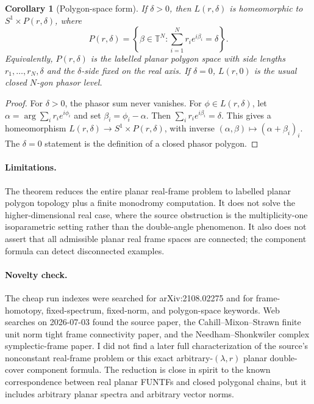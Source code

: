 \documentclass[11pt]{article}
\newtheorem{corollary}{Corollary}
\newcommand{\T}{\mathbb T}
\begin{document}
\begin{corollary}[Polygon-space form]
If \(\delta>0\), then \(L(r,\delta)\) is homeomorphic to \(S^1\times P(r,\delta)\), where
\[
P(r,\delta)=
\left\{\beta\in\T^N:\sum_{i=1}^N r_i e^{i\beta_i}=\delta\right\}.
\]
Equivalently, \(P(r,\delta)\) is the labelled planar polygon space with side lengths \(r_1,\dots,r_N,\delta\) and the \(\delta\)-side fixed on the real axis. If \(\delta=0\), \(L(r,0)\) is the usual closed \(N\)-gon phasor level.
\end{corollary}

\begin{proof}
For \(\delta>0\), the phasor sum never vanishes. For \(\phi\in L(r,\delta)\), let \(\alpha=\arg\sum_i r_i e^{i\phi_i}\) and set \(\beta_i=\phi_i-\alpha\). Then \(\sum_i r_i e^{i\beta_i}=\delta\). This gives a homeomorphism \(L(r,\delta)\to S^1\times P(r,\delta)\), with inverse \((\alpha,\beta)\mapsto(\alpha+\beta_i)_i\). The \(\delta=0\) statement is the definition of a closed phasor polygon.
\end{proof}

\paragraph{Limitations.}
The theorem reduces the entire planar real-frame problem to labelled planar polygon topology plus a finite monodromy computation. It does not solve the higher-dimensional real case, where the source obstruction is the multiplicity-one isoparametric setting rather than the double-angle phenomenon. It also does not assert that all admissible planar real frame spaces are connected; the component formula can detect disconnected examples.

\paragraph{Novelty check.}
The cheap run indexes were searched for arXiv:2108.02275 and for frame-homotopy, fixed-spectrum, fixed-norm, and polygon-space keywords. Web searches on 2026-07-03 found the source paper, the Cahill--Mixon--Strawn finite unit norm tight frame connectivity paper, and the Needham--Shonkwiler complex symplectic-frame paper. I did not find a later full characterization of the source's nonconstant real-frame problem or this exact arbitrary-\((\lambda,r)\) planar double-cover component formula. The reduction is close in spirit to the known correspondence between real planar FUNTFs and closed polygonal chains, but it includes arbitrary planar spectra and arbitrary vector norms.
\end{document}
